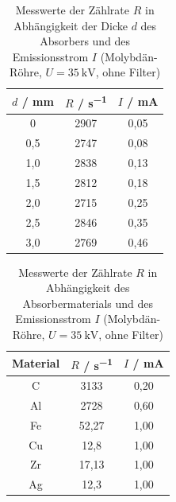 \documentclass{article}
\begin{document}
\begin{table}[H]
    \centering
    \caption{Messwerte der Zählrate $R$ in Abhängigkeit der Dicke $d$ des Absorbers und des Emissionsstrom $I$ (Molybdän-Röhre, $U = \SI{35}{\kilo\volt}$, ohne Filter)}
    \begin{tabular}{|c|c|c|}
        \hline
        $d$ / \si{\milli\meter} & $R$ / \si{\second \tothe{-1}} & $I$ / \si{\milli \ampere} \\ \hline \hline
         0 & 2907 & 0,05 \\ \hline
         0,5 & 2747 & 0,08 \\ \hline
         1,0 & 2838 & 0,13 \\ \hline
         1,5 & 2812 & 0,18 \\ \hline
         2,0 & 2715 & 0,25 \\ \hline
         2,5 & 2846 & 0,35 \\ \hline
         3,0 & 2769 & 0,46 \\ \hline
    \end{tabular}
    \label{tab:MesswerteAbschirmungDicke}
\end{table}

\begin{table}[H]
    \centering
    \caption{Messwerte der Zählrate $R$ in Abhängigkeit des Absorbermaterials und des Emissionsstrom $I$ (Molybdän-Röhre, $U = \SI{35}{\kilo\volt}$, ohne Filter)}
    \begin{tabular}{|c|c|c|}
        \hline
        Material & $R$ / \si{\second \tothe{-1}} & $I$ / \si{\milli \ampere} \\ \hline \hline
         C & 3133 & 0,20 \\ \hline
         Al & 2728 & 0,60 \\ \hline
         Fe & 52,27 & 1,00 \\ \hline
         Cu & 12,8 & 1,00 \\ \hline
         Zr & 17,13 & 1,00 \\ \hline
         Ag & 12,3 & 1,00 \\ \hline
    \end{tabular}
    \label{tab:MesswerteAbschirmungMaterial}
\end{table}
\end{document}
